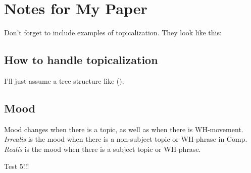 \documentclass[12pt]{article}
\begin{document}
\section*{Notes for My Paper}

Don't forget to include examples of topicalization.
They look like this:

{\small
{}
}

\subsection*{How to handle topicalization}

I'll just assume a tree structure like ().

{\small
{}
}

\subsection*{Mood}

Mood changes when there is a topic, as well as when
there is WH-movement.  \emph{Irrealis} is the mood when
there is a non-subject topic or WH-phrase in Comp.
\emph{Realis} is the mood when there is a subject topic
or WH-phrase.

Test 5!!!
\end{document}
